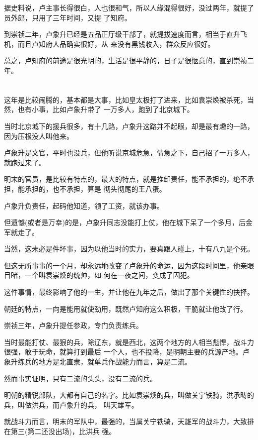 \documentclass[11pt,a4paper,onecolumn]{article}
\begin{document}
据史料说，卢主事长得很白，人也很和气，所以人缘混得很好，没过两年，就提了员外郎，只用了三年时间，又提
了知府。

到崇祯二年，卢象升已经是五品正厅级干部了，就提拔速度而言，相当于直升飞机，而且卢知府人品确实很好，从
来没有黑钱收入，群众反应很好。

总之，卢知府的前途是很光明的，生活是很平静的，日子是很惬意的，直到崇祯二年。

\section[\thesection]{}

这年是比较闹腾的，基本都是大事，比如皇太极打了进来，比如袁崇焕被杀死，当然，也有小事，比如卢象升带了
一万多人，跑到了北京城下。

当时北京城下的援兵很多，有十几路，卢象升这路并不起眼，却是最有趣的一路，因为压根没人叫他来。

卢象升是文官，平时也没兵，但他听说京城危急，情急之下，自己招了一万多人，就跑过来了。

明末的官员，是比较有特点的，最大的特点，就是推卸责任，能不承担的，绝不承担，能承担的，也不承担，算是
彻头彻尾的王八蛋。

卢象升负责任，起码他知道，领了工资，就该办事。

但遗憾(或者是万幸)的是，卢象升同志没能打上仗，他在城下呆了一个多月，后金军就走了。

当然，这未必是件坏事，因为以他当时的实力，要真跟人碰上，十有八九是个死。

但这无所事事的一个月，却永远地改变了卢象升的命运，因为这段时间里，他亲眼目睹，一个叫袁崇焕的统帅，如
何在一夜之间，变成了囚犯。

这件事情，最终影响了他的一生，并让他在九年之后，做出了那个关键性的抉择。

朝廷的特点，一向是能用就使劲用，既然卢知府这么积极，干脆就让他改了行。

崇祯三年，卢象升提任参政，专门负责练兵。

当时最能打仗、最狠的兵，除辽东，就是西北，这两个地方的人相当彪悍，战斗力很强，敢于玩命，就算打到最后
一个人，也不投降，是明朝主要的兵源产地。卢象升练兵的地方是北直隶，就单兵作战能力而言，算是二流。

然而事实证明，只有二流的头头，没有二流的兵。

明朝的精锐部队，大都有自己的名字。比如袁崇焕的兵，叫做关宁铁骑，洪承畴的兵，叫做洪兵，而卢象升的兵，
叫天雄军。

就战斗力而言，明末的军队中，最强的，当属关宁铁骑，天雄军的战斗力，大致排在第三(第二还没出场)，比洪兵
强。
\end{document}
